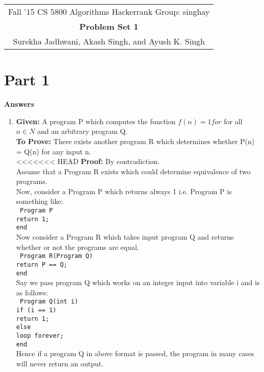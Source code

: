 \documentclass[12pt]{article}
\begin{document}
\begin{center}
\begin{tabular}{|c|}
\hline
Fall '15 CS 5800 Algorithms \hspace{5cm} Hackerrank Group: singhay\\
{\bfseries \large Problem Set 1}\\
Surekha Jadhwani, Akash Singh, and Ayush K. Singh\\
\hline
\end{tabular}
\end{center}

\section{Part 1}
\textbf{\large{Answers}}
\begin{enumerate}
\item
\textbf{Given:} A program P which computes the function $f(n)=1 for$ for all $n \in N$ and an arbitrary program Q.\\
\textbf{To Prove:} There exists another program R which determines whether P(n) = Q(n) for any input n.\\
<<<<<<< HEAD
\textbf{Proof:} By contradiction.\\
Assume that a Program R exists which could determine equivalence of two programs.\\
Now, consider a Program P which returns always 1 i.e. Program P is something like:\\
\texttt{
Program P\\
return 1;\\
end\\	}
Now consider a Program R which takes input program Q and returns whether or not the programs are equal.\\
\texttt{
	Program R(Program Q)\\
	return P == Q;\\
	end\\}
Say we pass program Q which works on an integer input into variable i and is as follows:\\
\texttt{
	Program Q(int i)\\
	if (i == 1)\\
	return 1;\\
	else\\
	loop forever;\\
	end\\}
Hence if a program Q in above format is passed, the program in many cases will never return an output. \\

\end{enumerate}
\end{document}
